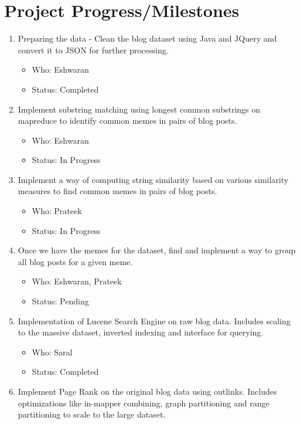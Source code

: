 \documentclass{acm_proc_article-sp}
\begin{document}
\section{Project Progress/Milestones}


\begin{enumerate}
  \item Preparing the data - Clean the blog dataset using Java and JQuery and convert it to JSON for further processing.	\begin{itemize}
	\item Who: Eshwaran
	\item Status: Completed
	\end{itemize}
  \item Implement substring matching using longest common substrings on mapreduce to identify common memes in pairs of blog posts. \begin{itemize}
	\item Who: Eshwaran
	\item Status: In Progress
	\end{itemize}
  \item Implement a way of computing string similarity based on various similarity measures to find common memes in pairs of blog posts.\begin{itemize}
	\item Who: Prateek
	\item Status: In Progress
	\end{itemize}
  \item Once we have the memes for the dataset, find and implement a way to group all blog posts for a given meme.\begin{itemize}
	\item Who: Eshwaran, Prateek
	\item Status: Pending
	\end{itemize}
  \item Implementation of Lucene Search Engine on raw blog data. Includes scaling to the massive dataset, inverted indexing and interface for querying.\begin{itemize}
	\item Who: Saral
	\item Status: Completed
	\end{itemize}
  \item Implement Page Rank on the original blog data using outlinks. Includes optimizations like in-mapper combining, graph partitioning and range partitioning to scale to the large dataset. \begin{itemize}

\end{itemize}
\end{enumerate}
\end{document}

